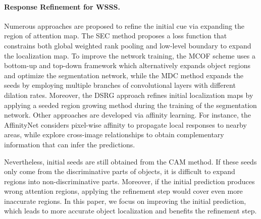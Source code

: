 \documentclass[10pt,twocolumn,letterpaper]{article}
\begin{document}
\paragraph{Response Refinement for WSSS.}
Numerous approaches \cite{ahn2018learning,fan2018cian, fan2018associating,huang2018weakly,kolesnikov2016seed,wang2018weakly,wei2018revisiting} are proposed to refine the initial cue via expanding the region of attention map.
The SEC method \cite {kolesnikov2016seed} proposes a loss function that constrains both global weighted rank pooling and low-level boundary to expand the localization map.
To improve the network training, the MCOF scheme \cite{wang2018weakly} uses a bottom-up and top-down framework which alternatively expands object regions and optimize the segmentation network, while the MDC method \cite{wei2018revisiting} expands the seeds by employing multiple branches of convolutional layers with different dilation rates.
Moreover, the DSRG approach \cite{huang2018weakly} refines initial localization maps by applying a seeded region growing method during the training of the segmentation network.
Other approaches are developed via affinity learning.
For instance, the AffinityNet \cite{ahn2018learning} considers pixel-wise affinity to propagate local responses to nearby areas, while \cite{fan2018cian, fan2018associating} explore cross-image relationships to obtain complementary information that can infer the predictions.


Nevertheless, initial seeds are still obtained from the CAM method. If these seeds only come from the discriminative parts of objects, it is difficult to expand regions into non-discriminative parts. Moreover, if the initial prediction produces wrong attention regions, applying the refinement step would cover even more inaccurate regions.
In this paper, we focus on improving the initial prediction, which leads to more accurate object localization and benefits the refinement step.
\end{document}
